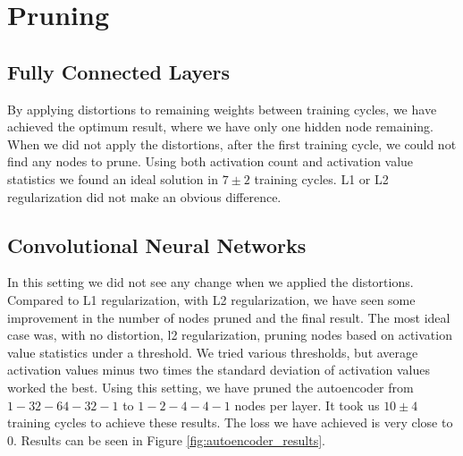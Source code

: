 \section{Pruning}
\subsection{Fully Connected Layers}
By applying distortions to remaining weights between training cycles, we have achieved the optimum result, where we have only one hidden node remaining. When we did not apply the distortions, after the first training cycle, we could not find any nodes to prune. Using both activation count and activation value statistics we found an ideal solution in $7 \pm 2$ training cycles. L1 or L2 regularization did not make an obvious difference.

\subsection{Convolutional Neural Networks}
In this setting we did not see any change when we applied the distortions. Compared to L1 regularization, with L2 regularization, we have seen some improvement in the number of nodes pruned and the final result. The most ideal case was, with no distortion, l2 regularization, pruning nodes based on activation value statistics under a threshold. We tried various thresholds, but average activation values minus two times the standard deviation of activation values worked the best. Using this setting, we have pruned the autoencoder from $1-32-64-32-1$ to $1-2-4-4-1$ nodes per layer. It took us $10\pm4$ training cycles to achieve these results. The loss we have achieved is very close to 0. Results can be seen in Figure \ref{fig:autoencoder_results}.

